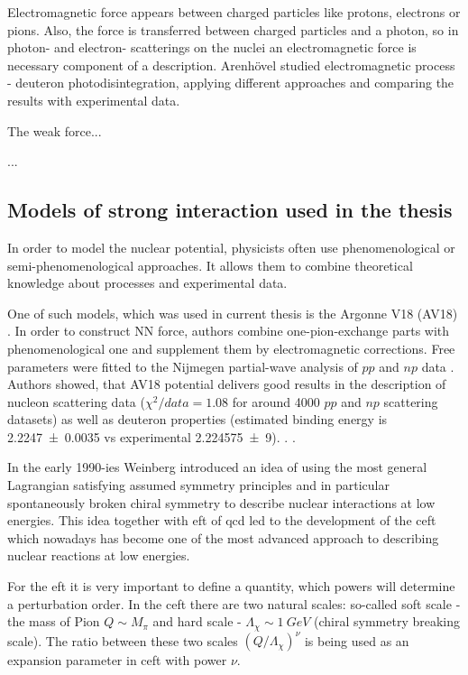 Electromagnetic force appears between charged particles like protons, electrons or pions.
Also, the force is transferred between charged particles and a photon, so 
in photon- and electron- scatterings on the nuclei an electromagnetic
force is necessary component of a description. Arenh\"{o}vel \cite{ArenhovelPhotodisint1991} 
studied electromagnetic process - deuteron photodisintegration,
applying different approaches and comparing the results with
experimental data.

The weak force...

...  

\subsection*{Models of strong interaction used in the thesis}

In order to model the nuclear potential, physicists often use phenomenological
or semi-phenomenological approaches. It allows them to combine
theoretical knowledge about processes and experimental data.

One of such models, which was used in current thesis is the Argonne V18 (AV18) \cite{AV18Wiringa}.
In order to construct NN force, authors combine
one-pion-exchange parts
with phenomenological one and supplement them by electromagnetic corrections.
Free parameters were fitted to
the Nijmegen partial-wave analysis of $pp$ and $np$ data \cite{NijmegenPhysRevC.48.792}. 
Authors showed, that AV18 potential delivers good results
in the description of nucleon scattering data ($\chi ^2/data = 1.08$ for around \num{4000} $pp$ and $np$ scattering datasets) 
as well as deuteron properties (estimated binding energy is \SI{2.2247(35)}{\mev} vs experimental \SI{ 2.224 575(9)}{\mev}). . .


In the early 1990-ies Weinberg \cite{WEINBERG1990,WEINBERG1991} introduced 
an idea of using the most general Lagrangian
satisfying assumed symmetry principles and in particular
spontaneously broken chiral symmetry to 
describe nuclear interactions at low energies.
This idea together with \gls{eft} of \gls{qcd} 
led to the development of the \gls{ceft}
which nowadays has become one of the most advanced approach to
describing nuclear reactions at low energies.
 
For the \gls{eft} it is very important to 
define a quantity, which powers will determine a perturbation order.
In the \gls{ceft} there are two natural scales: so-called soft scale -
the mass of Pion $Q \sim M_\pi$ and hard scale -
$\Lambda_\chi \sim 1~GeV$ (chiral symmetry breaking scale).
The ratio between these two scales $(Q/\Lambda_\chi)^\nu$
is being used as an expansion parameter in  \gls{ceft} with power
$\nu$.

